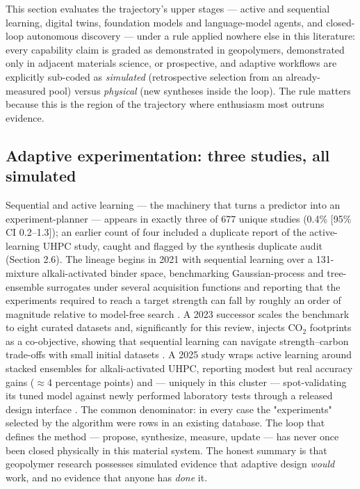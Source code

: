 \documentclass[pdflatex,sn-basic]{sn-jnl}
\begin{document}
This section evaluates the trajectory's upper stages --- active and sequential learning, digital twins, foundation models and language-model agents, and closed-loop autonomous discovery --- under a rule applied nowhere else in this literature: every capability claim is graded as demonstrated in geopolymers, demonstrated only in adjacent materials science, or prospective, and adaptive workflows are explicitly sub-coded as \emph{simulated} (retrospective selection from an already-measured pool) versus \emph{physical} (new syntheses inside the loop). The rule matters because this is the region of the trajectory where enthusiasm most outruns evidence.

\subsection{Adaptive experimentation: three studies, all simulated}

Sequential and active learning --- the machinery that turns a predictor into an experiment-planner --- appears in exactly three of 677 unique studies (0.4\% [95\% CI 0.2--1.3]); an earlier count of four included a duplicate report of the active-learning UHPC study, caught and flagged by the synthesis duplicate audit (Section 2.6). The lineage begins in 2021 with sequential learning over a 131-mixture alkali-activated binder space, benchmarking Gaussian-process and tree-ensemble surrogates under several acquisition functions and reporting that the experiments required to reach a target strength can fall by roughly an order of magnitude relative to model-free search \citep{volker2021}. A 2023 successor scales the benchmark to eight curated datasets and, significantly for this review, injects CO$_2$ footprints as a co-objective, showing that sequential learning can navigate strength--carbon trade-offs with small initial datasets \citep{volker2023}. A 2025 study wraps active learning around stacked ensembles for alkali-activated UHPC, reporting modest but real accuracy gains ($\approx$4 percentage points) and --- uniquely in this cluster --- spot-validating its tuned model against newly performed laboratory tests through a released design interface \citep{kazemi2025}. The common denominator: in every case the "experiments" selected by the algorithm were rows in an existing database. The loop that defines the method --- propose, synthesize, measure, update --- has never once been closed physically in this material system. The honest summary is that geopolymer research possesses simulated evidence that adaptive design \emph{would} work, and no evidence that anyone has \emph{done} it.
\end{document}
